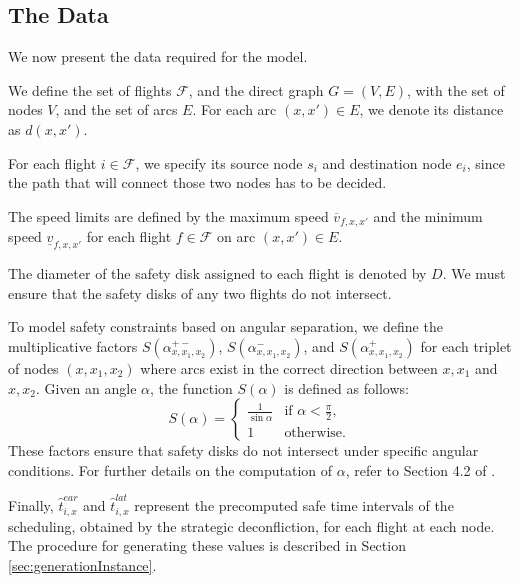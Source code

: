 \documentclass[../../thesis.tex]{subfiles}
\begin{document}
\subsection{The Data} \label{sec:modelData}  

We now present the data required for the model.  

We define the set of flights \(\mathcal F \),  and the direct graph $G=(V,E)$, with the set of nodes \( V \), and the set of arcs \( E \).  
For each arc \( (x,x') \in E \), we denote its distance as \( d(x,x') \).  

For each flight \( i \in\mathcal F\), we specify its source node \( s_i \) and destination node \( e_i \), since the path that will connect those two nodes has to be decided.  

The speed limits are defined by the maximum speed \( \overline{v}_{f,x,x'} \) and the minimum speed \( \underline{v}_{f,x,x'} \) for each flight \( f\in\mathcal F \) on arc \( (x,x')\in E\).  

The diameter of the safety disk assigned to each flight is denoted by \( D \). We must ensure that the safety disks of any two flights do not intersect.  

To model safety constraints based on angular separation, we define the multiplicative factors \( S(\alpha^{+-}_{x,x_1,x_2}) \), \( S(\alpha^{-}_{x,x_1,x_2}) \), and \( S(\alpha^{+}_{x,x_1,x_2}) \) for each triplet of nodes \( (x, x_1, x_2) \) where arcs exist in the correct direction between \( x, x_1 \) and \( x, x_2 \).  
Given an angle \( \alpha \), the function \( S(\alpha) \) is defined as follows:  
\[
S(\alpha) = 
\begin{cases} 
\frac{1}{\sin\alpha} & \text{if } \alpha < \frac{\pi}{2}, \\ 
1 & \text{otherwise}.  
\end{cases} 
\]  
These factors ensure that safety disks do not intersect under specific angular conditions.  
For further details on the computation of \( \alpha \), refer to Section 4.2 of \cite{pelegrin-2023}.  

Finally, \( \hat{t}^{ear}_{i,x} \) and \( \hat{t}^{lat}_{i,x} \) represent the precomputed safe time intervals of the scheduling, obtained by the strategic deconfliction, for each flight at each node.  
The procedure for generating these values is described in Section \ref{sec:generationInstance}.  
\end{document}
